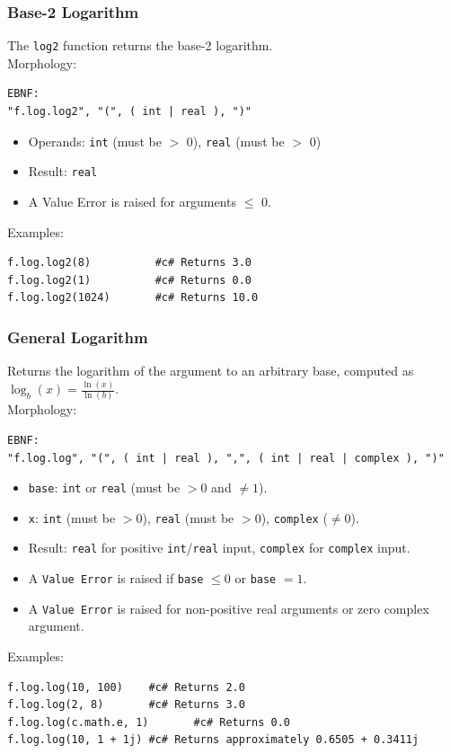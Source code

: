 \subsubsection{Base-2 Logarithm}
The \texttt{log2} function returns the base-2 logarithm.\\
Morphology:
\begin{verbatim}
EBNF:
"f.log.log2", "(", ( int | real ), ")"
\end{verbatim}
\begin{itemize}
\item Operands: \texttt{int} (must be $>$ 0), \texttt{real} (must be $>$ 0)
\item Result: \texttt{real}
\item A Value Error is raised for arguments $\leq$ 0.
\end{itemize}
Examples:
\begin{verbatim}
f.log.log2(8)          #c# Returns 3.0
f.log.log2(1)          #c# Returns 0.0
f.log.log2(1024)       #c# Returns 10.0
\end{verbatim}

\subsubsection{General Logarithm}
Returns the logarithm of the argument to an arbitrary base, computed as $\log_b(x) = \frac{\ln(x)}{\ln(b)}$. \\
Morphology:
\begin{verbatim}
EBNF:
"f.log.log", "(", ( int | real ), ",", ( int | real | complex ), ")"
\end{verbatim}
\begin{itemize}
\item \texttt{base}: \texttt{int} or \texttt{real} (must be $> 0$ and $\neq 1$).
\item \texttt{x}: \texttt{int} (must be $> 0$), \texttt{real} (must be $> 0$), \texttt{complex} ($\neq 0$).
\item Result: \texttt{real} for positive \texttt{int}/\texttt{real} input, \texttt{complex} for \texttt{complex} input.
\item A \texttt{Value Error} is raised if \texttt{base} $\leq 0$ or \texttt{base} $= 1$.
\item A \texttt{Value Error} is raised for non-positive real arguments or zero complex argument.
\end{itemize}
Examples:
\begin{verbatim}
f.log.log(10, 100)    #c# Returns 2.0
f.log.log(2, 8)       #c# Returns 3.0
f.log.log(c.math.e, 1)       #c# Returns 0.0
f.log.log(10, 1 + 1j) #c# Returns approximately 0.6505 + 0.3411j
\end{verbatim}

